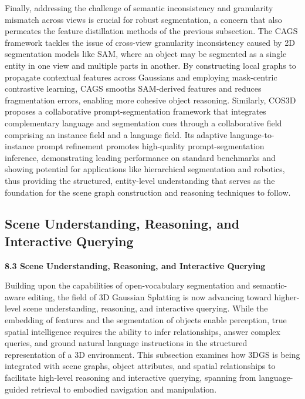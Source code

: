 \documentclass[11pt]{article}
\begin{document}
Finally, addressing the challenge of semantic inconsistency and granularity mismatch across views is crucial for robust segmentation, a concern that also permeates the feature distillation methods of the previous subsection. The CAGS framework \cite{ref495} tackles the issue of cross-view granularity inconsistency caused by 2D segmentation models like SAM, where an object may be segmented as a single entity in one view and multiple parts in another. By constructing local graphs to propagate contextual features across Gaussians and employing mask-centric contrastive learning, CAGS smooths SAM-derived features and reduces fragmentation errors, enabling more cohesive object reasoning. Similarly, COS3D \cite{ref520} proposes a collaborative prompt-segmentation framework that integrates complementary language and segmentation cues through a collaborative field comprising an instance field and a language field. Its adaptive language-to-instance prompt refinement promotes high-quality prompt-segmentation inference, demonstrating leading performance on standard benchmarks and showing potential for applications like hierarchical segmentation and robotics, thus providing the structured, entity-level understanding that serves as the foundation for the scene graph construction and reasoning techniques to follow.

\subsection{Scene Understanding, Reasoning, and Interactive Querying}

\textbf{8.3 Scene Understanding, Reasoning, and Interactive Querying}

Building upon the capabilities of open-vocabulary segmentation and semantic-aware editing, the field of 3D Gaussian Splatting is now advancing toward higher-level scene understanding, reasoning, and interactive querying. While the embedding of features and the segmentation of objects enable perception, true spatial intelligence requires the ability to infer relationships, answer complex queries, and ground natural language instructions in the structured representation of a 3D environment. This subsection examines how 3DGS is being integrated with scene graphs, object attributes, and spatial relationships to facilitate high-level reasoning and interactive querying, spanning from language-guided retrieval to embodied navigation and manipulation.
\end{document}
